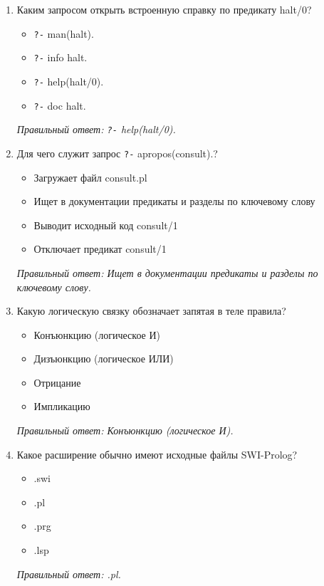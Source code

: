 \begin{enumerate}[label=\textbf{\arabic*.}, leftmargin=0pt, itemsep=1.2em]
\item Каким запросом открыть встроенную справку по предикату halt/0?
\begin{itemize}[label=$\square$, leftmargin=1.5cm, itemsep=0.2em, topsep=0.3em]
\item \texttt{?-} man(halt).
\item \texttt{?-} info halt.
\item \texttt{?-} help(halt/0).
\item \texttt{?-} doc halt.
\end{itemize}
{\small\textit{Правильный ответ: \texttt{?-} help(halt/0).}}

\item Для чего служит запрос \texttt{?-} apropos(consult).?
\begin{itemize}[label=$\square$, leftmargin=1.5cm, itemsep=0.2em, topsep=0.3em]
\item Загружает файл consult.pl
\item Ищет в документации предикаты и разделы по ключевому слову
\item Выводит исходный код consult/1
\item Отключает предикат consult/1
\end{itemize}
{\small\textit{Правильный ответ: Ищет в документации предикаты и разделы по ключевому слову.}}

\item Какую логическую связку обозначает запятая в теле правила?
\begin{itemize}[label=$\square$, leftmargin=1.5cm, itemsep=0.2em, topsep=0.3em]
\item Конъюнкцию (логическое И)
\item Дизъюнкцию (логическое ИЛИ)
\item Отрицание
\item Импликацию
\end{itemize}
{\small\textit{Правильный ответ: Конъюнкцию (логическое И).}}

\item Какое расширение обычно имеют исходные файлы SWI-Prolog?
\begin{itemize}[label=$\square$, leftmargin=1.5cm, itemsep=0.2em, topsep=0.3em]
\item .swi
\item .pl
\item .prg
\item .lsp
\end{itemize}
{\small\textit{Правильный ответ: .pl.}}


\end{enumerate}

